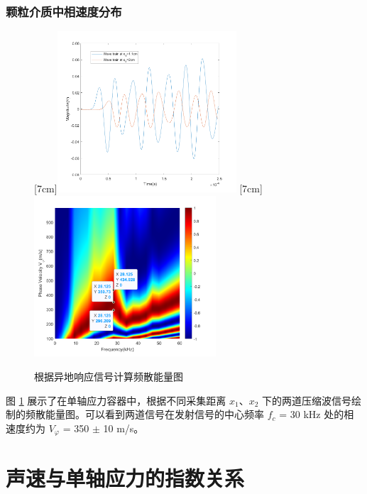 \subsubsection{颗粒介质中相速度分布}


\begin{figure}[!hbtp]
  \centering
                [7cm]{\includegraphics[height=6cm]{figures/2_wave_train.png}}
  \hspace{1cm}
                [7cm]{\includegraphics[height=6cm]{figures/2_cwt_v_phi.png}}
  \caption{根据异地响应信号计算频散能量图}%
  \label{fig:dispersion_energy}
\end{figure}

图 \ref{fig:dispersion_energy} 展示了在单轴应力容器中，根据不同采集距离 $x_{1}$、$x_{2}$ 下的两道压缩波信号绘制的频散能量图。可以看到两道信号在发射信号的中心频率 $f_{c}$ = 30 \unit{\kilo\hertz} 处的相速度约为 $V_{\varphi}$ = 350 $\pm$ 10 \unit{\meter}/\unit{\second}。

\section{声速与单轴应力的指数关系}


